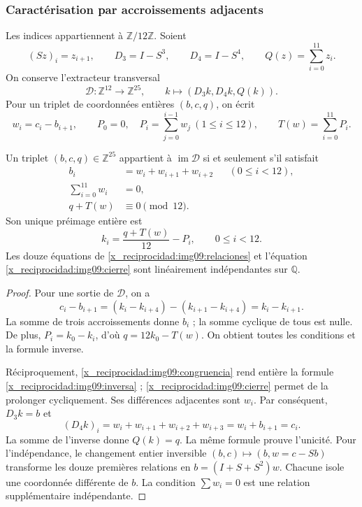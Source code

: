 \subsubsection{Caractérisation par accroissements adjacents}

Les indices appartiennent à $\mathbb Z/12\mathbb Z$. Soient
\[
 (Sz)_i=z_{i+1},\qquad D_3=I-S^3,\qquad D_4=I-S^4,
 \qquad Q(z)=\sum_{i=0}^{11}z_i.
\]
On conserve l'extracteur transversal
\[
 \mathcal D:\mathbb Z^{12}\longrightarrow\mathbb Z^{25},
 \qquad k\longmapsto(D_3k,D_4k,Q(k)).
\]
Pour un triplet de coordonnées entières $(b,c,q)$, on écrit
\begin{equation}
 w_i=c_i-b_{i+1},\qquad
 P_0=0,\quad P_i=\sum_{j=0}^{i-1}w_j\ (1\leq i\leq12),
 \qquad T(w)=\sum_{i=0}^{11}P_i.
 \label{x_reciprocidad:img09:incremento}
\end{equation}

\begin{theorem}
\label{x_reciprocidad:img09:imagen}
Un triplet $(b,c,q)\in\mathbb Z^{25}$ appartient à
$\operatorname{im}\mathcal D$ si et seulement s'il satisfait
\begin{align}
 b_i&=w_i+w_{i+1}+w_{i+2}&& (0\leq i<12),
 \label{x_reciprocidad:img09:relaciones}\\
 \sum_{i=0}^{11}w_i&=0,
 \label{x_reciprocidad:img09:cierre}\\
 q+T(w)&\equiv0\pmod {12}.
 \label{x_reciprocidad:img09:congruencia}
\end{align}
Son unique préimage entière est
\begin{equation}
 k_i=\frac{q+T(w)}{12}-P_i,\qquad0\leq i<12.
 \label{x_reciprocidad:img09:inversa}
\end{equation}
Les douze équations de \eqref{x_reciprocidad:img09:relaciones} et l'équation
\eqref{x_reciprocidad:img09:cierre} sont linéairement indépendantes sur $\mathbb Q$.
\end{theorem}
\begin{proof}
Pour une sortie de $\mathcal D$, on a
\[
 c_i-b_{i+1}=(k_i-k_{i+4})-(k_{i+1}-k_{i+4})=k_i-k_{i+1}.
\]
La somme de trois accroissements donne $b_i$ ; la somme cyclique de tous
est nulle. De plus, $P_i=k_0-k_i$, d'où
$q=12k_0-T(w)$. On obtient toutes les conditions et la formule inverse.

Réciproquement, \eqref{x_reciprocidad:img09:congruencia} rend entière la formule
\eqref{x_reciprocidad:img09:inversa} ; \eqref{x_reciprocidad:img09:cierre} permet de la prolonger
cycliquement. Ses différences adjacentes sont $w_i$. Par conséquent,
$D_3k=b$ et
\[
 (D_4k)_i=w_i+w_{i+1}+w_{i+2}+w_{i+3}
 =w_i+b_{i+1}=c_i.
\]
La somme de l'inverse donne $Q(k)=q$. La même formule prouve l'unicité.
Pour l'indépendance, le changement entier inversible
$(b,c)\mapsto(b,w=c-Sb)$ transforme les douze premières relations en
$b=(I+S+S^2)w$. Chacune isole une coordonnée différente de $b$.
La condition $\sum w_i=0$ est une relation supplémentaire indépendante.
\end{proof}

